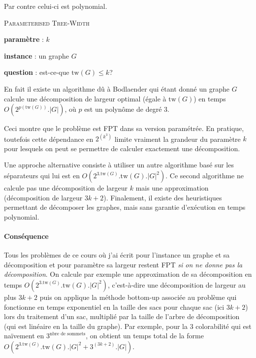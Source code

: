 \documentclass[a4paper,12pt]{article}
\theoremstyle{definition}
\theoremstyle{remark}
\newcommand{\tw}[1]{\ensuremath{\mathrm{tw}(#1)}}
\begin{document}
Par contre celui-ci est polynomial.
\begin{framed}\textsc{Parameterised Tree-Width}
  \begin{compactitem}
  \item \textbf{paramètre} : $k$
  \item \textbf{instance} : un graphe $G$
  \item \textbf{question} : est-ce-que $\tw{G}\leq k$? 
  \end{compactitem}
\end{framed}

En fait il existe un algorithme dû à Bodlaender qui étant donné un
graphe $G$ calcule une décomposition de largeur optimal (égale à
$\tw{G}$) en temps $O(2^{p(\tw{G})}.|G|)$, où $p$ est un polynôme de
degré 3.

Ceci montre que le problème est FPT dans sa version paramétrée. 
En pratique, toutefois cette dépendance en $2^{(k^3)}$ limite vraiment
la grandeur du paramètre $k$ pour lesquels on peut se permettre de
calculer exactement une décomposition. 

Une approche alternative consiste à utiliser un autre algorithme  basé
sur les séparateurs qui lui est en $O(2^{3.\tw{G}}.\tw{G}.|G|^2)$. 
Ce second algorithme ne calcule pas une décomposition de largeur $k$
mais une approximation (décomposition de largeur $3k+2$). Finalement,
il existe des heuristiques permettant de décomposer les graphes, mais
sans garantie d'exécution en temps polynomial.

\paragraph{Conséquence}
Tous les problèmes de ce cours où j'ai écrit pour l'instance un graphe
et sa décomposition et pour paramètre sa largeur restent FPT \emph{si on ne donne
  pas la décomposition}. On calcule par exemple une approximation de sa
décomposition en temps $O(2^{3.\tw{G}}.\tw{G}.|G|^2)$, c'est-à-dire
une décomposition de largeur au plus $3k+2$ puis on applique la
méthode bottom-up associée au problème qui fonctionne en temps
exponentiel en la taille des sacs pour chaque sac (ici $3k+2$) lors du
traitement d'un sac, multiplié par la taille de l'arbre de
décomposition (qui est linéaire en la taille du graphe). 
Par exemple, pour la 3 colorabilité qui est naïvement en
$3^{\text{nbre de sommets}}$, on obtient un temps total de la forme
$O(2^{3.\tw{G}}.\tw{G}.|G|^2 + 3^{(3k+2)}.|G|)$.
\end{document}
